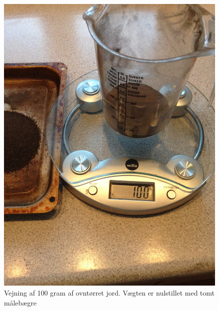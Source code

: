 \begin{figure}[H]
	\centering 
	\includegraphics[scale=0.08]{HardwareArkitektur/Sensore/Jordfugt_billeder/Opvejning.JPG}
	\caption{Vejning af 100 gram af ovntørret jord. Vægten er nulstillet med tomt målebægre}
	\label{photo:Opvejning}
\end{figure}  
 
